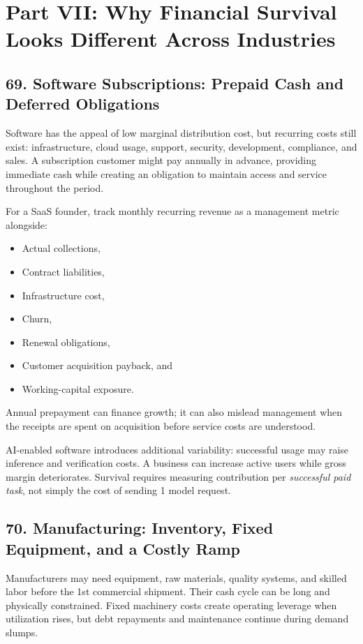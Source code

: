 \section*{Part VII: Why Financial Survival Looks Different Across Industries}

\subsection*{69. Software Subscriptions: Prepaid Cash and Deferred Obligations}

Software has the appeal of low marginal distribution cost, but recurring costs still exist: infrastructure, cloud usage, support, security, development, compliance, and sales. A subscription customer might pay annually in advance, providing immediate cash while creating an obligation to maintain access and service throughout the period.

For a SaaS founder, track monthly recurring revenue as a management metric alongside:
\begin{itemize}
\item Actual collections,
\item Contract liabilities,
\item Infrastructure cost,
\item Churn,
\item Renewal obligations,
\item Customer acquisition payback, and
\item Working-capital exposure.
\end{itemize}
Annual prepayment can finance growth; it can also mislead management when the receipts are spent on acquisition before service costs are understood.

AI-enabled software introduces additional variability: successful usage may raise inference and verification costs. A business can increase active users while gross margin deteriorates. Survival requires measuring contribution per \emph{successful paid task}, not simply the cost of sending 1 model request.

\subsection*{70. Manufacturing: Inventory, Fixed Equipment, and a Costly Ramp}

Manufacturers may need equipment, raw materials, quality systems, and skilled labor before the 1st commercial shipment. Their cash cycle can be long and physically constrained. Fixed machinery costs create operating leverage when utilization rises, but debt repayments and maintenance continue during demand slumps.

